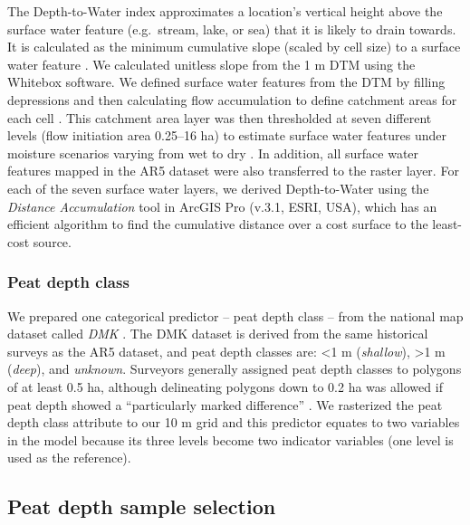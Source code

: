 \documentclass[soil, manuscript]{copernicus}
\begin{document}
The Depth-to-Water index \citep{murphyMappingWetlandsComparison2007} approximates a location's vertical height above the surface water feature (e.g.~stream, lake, or sea) that it is likely to drain towards.
It is calculated as the minimum cumulative slope (scaled by cell size) to a surface water feature \citep[eq. 5 in][]{murphyTopographicModellingSoil2009}.
We calculated unitless slope from the 1 m DTM using the Whitebox software.
We defined surface water features from the DTM by filling depressions and then calculating flow accumulation to define catchment areas for each cell \citep{schonauerSpatiotemporalPredictionSoil2021, schonauerRcodeCalculatingDepthwater2021}.
This catchment area layer was then thresholded at seven different levels (flow initiation area 0.25--16 ha) to estimate surface water features under moisture scenarios varying from wet to dry \citep{murphyModellingMappingTopographic2011, agrenEvaluatingDigitalTerrain2014, schonauerSpatiotemporalPredictionSoil2021}.
In addition, all surface water features mapped in the AR5 dataset were also transferred to the raster layer.
For each of the seven surface water layers, we derived Depth-to-Water using the \emph{Distance Accumulation} tool in ArcGIS Pro (v.3.1, ESRI, USA), which has an efficient algorithm to find the cumulative distance over a cost surface to the least-cost source.

\subsubsection{Peat depth class}

We prepared one categorical predictor -- peat depth class -- from the national map dataset called \emph{DMK} \citep{ahlstromAR5Klassifikasjonssystem2019}.
The DMK dataset is derived from the same historical surveys as the AR5 dataset, and peat depth classes are: \textless1 m (\emph{shallow}), \textgreater1 m (\emph{deep}), and \emph{unknown}.
Surveyors generally assigned peat depth classes to polygons of at least 0.5 ha, although delineating polygons down to 0.2 ha was allowed if peat depth showed a ``particularly marked difference'' \citep{bjordalMarkslagsklassifikasjonOkonomiskKartverk2007}.
We rasterized the peat depth class attribute to our 10 m grid and this predictor equates to two variables in the model because its three levels become two indicator variables (one level is used as the reference).

\subsection{Peat depth sample selection}
\end{document}
